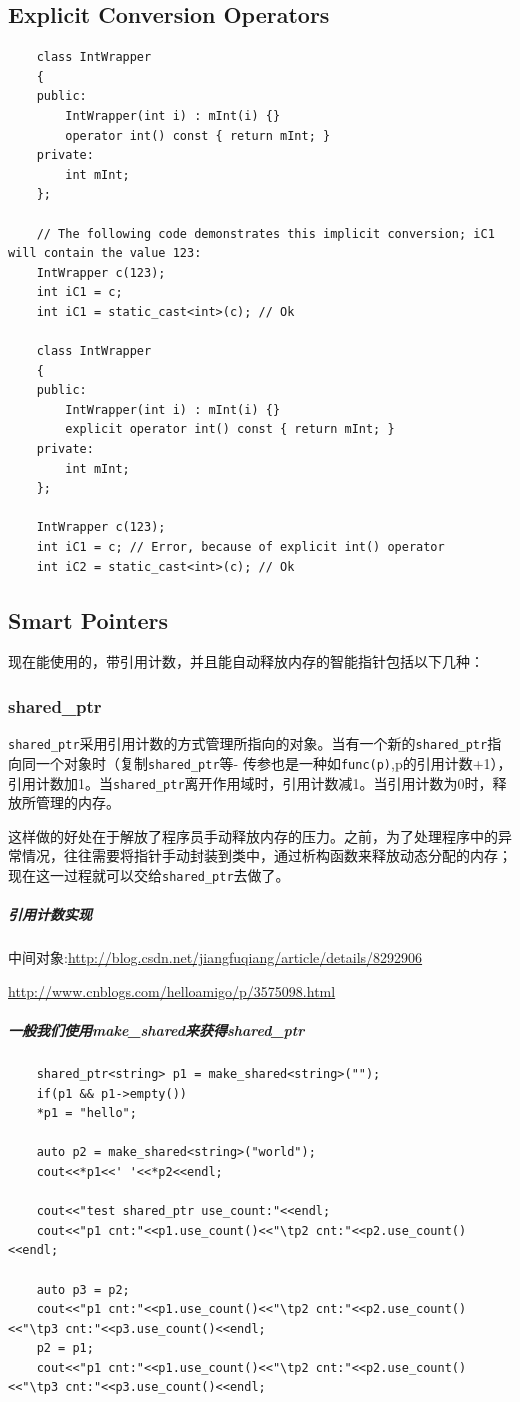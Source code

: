 \documentclass[UTF8,a4paper,12pt]{ctexbook} %
\begin{document}
		\subsection{Explicit Conversion Operators}
			\begin{lstlisting}
	class IntWrapper
	{
	public:
		IntWrapper(int i) : mInt(i) {}
		operator int() const { return mInt; }
	private:
		int mInt;
	};
	
	// The following code demonstrates this implicit conversion; iC1 will contain the value 123:
	IntWrapper c(123);
	int iC1 = c;
	int iC1 = static_cast<int>(c); // Ok
	
	class IntWrapper
	{
	public:
		IntWrapper(int i) : mInt(i) {}
		explicit operator int() const { return mInt; }
	private:
		int mInt;
	};
	
	IntWrapper c(123);
	int iC1 = c; // Error, because of explicit int() operator
	int iC2 = static_cast<int>(c); // Ok
			\end{lstlisting}
		
		\subsection{Smart Pointers}
			现在能使用的，带引用计数，并且能自动释放内存的智能指针包括以下几种：
			\subsubsection{shared\_ptr}
				\verb|shared_ptr|采用引用计数的方式管理所指向的对象。当有一个新的\verb|shared_ptr|指向同一个对象时（复制\verb|shared_ptr|等- 传参也是一种如\verb|func(p)|,p的引用计数+1），引用计数加1。当\verb|shared_ptr|离开作用域时，引用计数减1。当引用计数为0时，释放所管理的内存。
					
				这样做的好处在于解放了程序员手动释放内存的压力。之前，为了处理程序中的异常情况，往往需要将指针手动封装到类中，通过析构函数来释放动态分配的内存；现在这一过程就可以交给\verb|shared_ptr|去做了。
				
				\subparagraph{引用计数实现}
					中间对象:\url{http://blog.csdn.net/jiangfuqiang/article/details/8292906}
					
					\url{http://www.cnblogs.com/helloamigo/p/3575098.html}	
				\subparagraph{一般我们使用make\_shared来获得shared\_ptr}
				\begin{lstlisting}
	shared_ptr<string> p1 = make_shared<string>("");
	if(p1 && p1->empty())
	*p1 = "hello";
	
	auto p2 = make_shared<string>("world");
	cout<<*p1<<' '<<*p2<<endl;
	
	cout<<"test shared_ptr use_count:"<<endl;
	cout<<"p1 cnt:"<<p1.use_count()<<"\tp2 cnt:"<<p2.use_count()<<endl;
	
	auto p3 = p2;
	cout<<"p1 cnt:"<<p1.use_count()<<"\tp2 cnt:"<<p2.use_count()<<"\tp3 cnt:"<<p3.use_count()<<endl;
	p2 = p1;
	cout<<"p1 cnt:"<<p1.use_count()<<"\tp2 cnt:"<<p2.use_count()<<"\tp3 cnt:"<<p3.use_count()<<endl;
				\end{lstlisting}				
			
\end{document}
